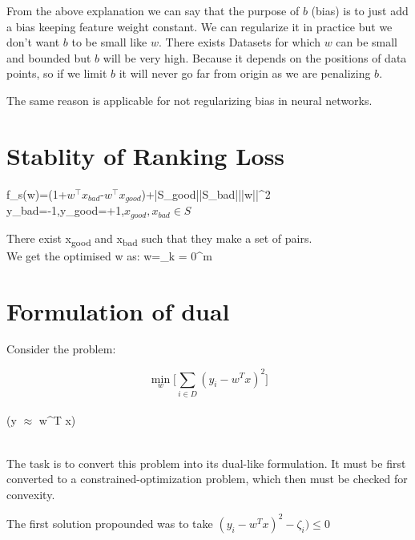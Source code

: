 \documentclass[11pt, twosides]{article}
\begin{document}
From the above explanation we can say that the purpose of $b$ (bias) is to just add a bias keeping feature weight constant. We can regularize it in practice but we don't want $b$ to be small like $w$. There exists Datasets for which $w$ can be small and bounded but $b$ will be very high. Because it depends on the positions of data points, so if we limit $b$ it will never go far from origin as we are penalizing $b$.  

The same reason is applicable for not regularizing bias in neural networks.


\section{Stablity of Ranking Loss}

\begin{center}
    
{f_s(w)=\Large{\sum({1+$w^\top{x_{bad}}$-$w^\top{x_{good}}$}})+\lambda|S_{good}||S_{bad}|||w||^2}\\
\small{{y_{bad}=-1,y_{good}=+1,$x_{good},x_{bad}\in S$}}\end{center}
There exist x\textsubscript{good} and x\textsubscript{bad} such that they make a set of pairs.\\
We get the optimised w as:
\centering w=\sum\limits_{k = 0}^{m}


\raggedright
\section{Formulation of dual}

\normalsize
Consider the problem: 
\begin{center}\begin{center}
    \vspace{-30pt}
 \[{ \min_{w} [\sum \limits_{i\in D} (y_i - w^T x)^2}]\]
 \\ (y ${\approx}$ w^T x)
\end{center}\end{center}
\\

 The task is to convert this problem into its dual-like formulation. It must be first converted to a constrained-optimization problem, which then must be checked for convexity.

The first solution propounded was to take $(y_i - w^T x)^2 - \zeta_{i}) \le 0$
\end{document}
